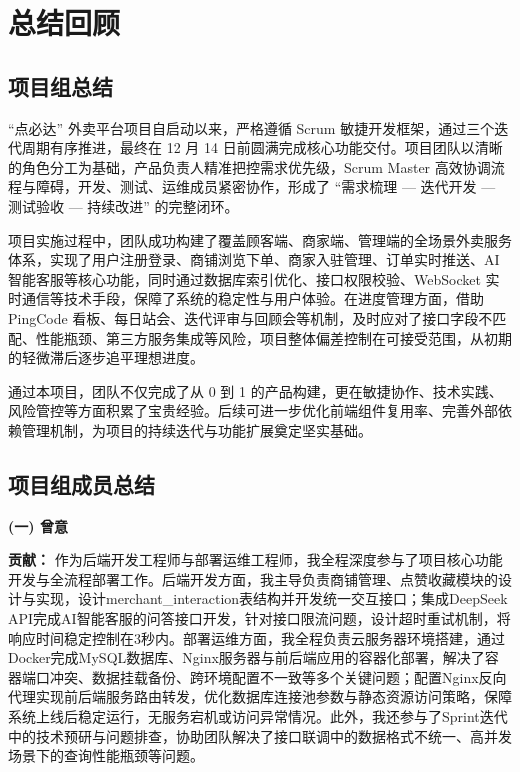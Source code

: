 \chapter{总结回顾}


\section{项目组总结}

“点必达” 外卖平台项目自启动以来，严格遵循 Scrum 敏捷开发框架，通过三个迭代周期有序推进，最终在 12 月 14 日前圆满完成核心功能交付。项目团队以清晰的角色分工为基础，产品负责人精准把控需求优先级，Scrum Master 高效协调流程与障碍，开发、测试、运维成员紧密协作，形成了 “需求梳理 — 迭代开发 — 测试验收 — 持续改进” 的完整闭环。

项目实施过程中，团队成功构建了覆盖顾客端、商家端、管理端的全场景外卖服务体系，实现了用户注册登录、商铺浏览下单、商家入驻管理、订单实时推送、AI 智能客服等核心功能，同时通过数据库索引优化、接口权限校验、WebSocket 实时通信等技术手段，保障了系统的稳定性与用户体验。在进度管理方面，借助 PingCode 看板、每日站会、迭代评审与回顾会等机制，及时应对了接口字段不匹配、性能瓶颈、第三方服务集成等风险，项目整体偏差控制在可接受范围，从初期的轻微滞后逐步追平理想进度。

通过本项目，团队不仅完成了从 0 到 1 的产品构建，更在敏捷协作、技术实践、风险管控等方面积累了宝贵经验。后续可进一步优化前端组件复用率、完善外部依赖管理机制，为项目的持续迭代与功能扩展奠定坚实基础。


\section{项目组成员总结}

\noindent \textbf{(一) 曾意}

\textbf{贡献：} 作为后端开发工程师与部署运维工程师，我全程深度参与了项目核心功能开发与全流程部署工作。后端开发方面，我主导负责商铺管理、点赞收藏模块的设计与实现，设计merchant\_interaction表结构并开发统一交互接口；集成DeepSeek API完成AI智能客服的问答接口开发，针对接口限流问题，设计超时重试机制，将响应时间稳定控制在3秒内。部署运维方面，我全程负责云服务器环境搭建，通过Docker完成MySQL数据库、Nginx服务器与前后端应用的容器化部署，解决了容器端口冲突、数据挂载备份、跨环境配置不一致等多个关键问题；配置Nginx反向代理实现前后端服务路由转发，优化数据库连接池参数与静态资源访问策略，保障系统上线后稳定运行，无服务宕机或访问异常情况。此外，我还参与了Sprint迭代中的技术预研与问题排查，协助团队解决了接口联调中的数据格式不统一、高并发场景下的查询性能瓶颈等问题。

